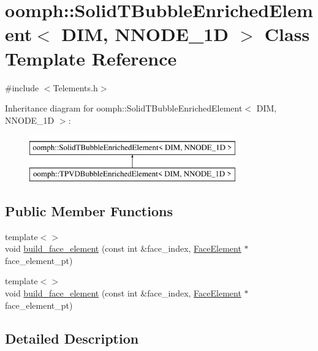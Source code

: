 \hypertarget{classoomph_1_1SolidTBubbleEnrichedElement}{}\section{oomph\+:\+:Solid\+T\+Bubble\+Enriched\+Element$<$ D\+IM, N\+N\+O\+D\+E\+\_\+1D $>$ Class Template Reference}
\label{classoomph_1_1SolidTBubbleEnrichedElement}


{\ttfamily \#include $<$Telements.\+h$>$}

Inheritance diagram for oomph\+:\+:Solid\+T\+Bubble\+Enriched\+Element$<$ D\+IM, N\+N\+O\+D\+E\+\_\+1D $>$\+:\begin{figure}[H]
\begin{center}
\leavevmode
\includegraphics[height=2.000000cm]{classoomph_1_1SolidTBubbleEnrichedElement}
\end{center}
\end{figure}
\subsection*{Public Member Functions}
\begin{DoxyCompactItemize}
\item 
{\footnotesize template$<$$>$ }\\void \hyperlink{classoomph_1_1SolidTBubbleEnrichedElement_ac8eee06072cefe41b9c1c1ce226e6cf3}{build\+\_\+face\+\_\+element} (const int \&face\+\_\+index, \hyperlink{classoomph_1_1FaceElement}{Face\+Element} $\ast$face\+\_\+element\+\_\+pt)
\item 
{\footnotesize template$<$$>$ }\\void \hyperlink{classoomph_1_1SolidTBubbleEnrichedElement_aa1dabe95e4bf687052640219350bd6f3}{build\+\_\+face\+\_\+element} (const int \&face\+\_\+index, \hyperlink{classoomph_1_1FaceElement}{Face\+Element} $\ast$face\+\_\+element\+\_\+pt)
\end{DoxyCompactItemize}


\subsection{Detailed Description}
